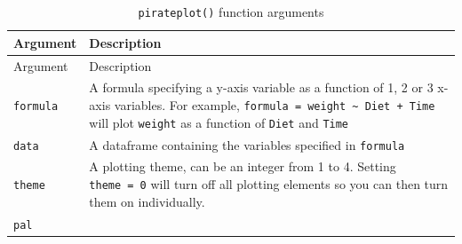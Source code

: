 \documentclass[]{book}
\theoremstyle{definition}
\theoremstyle{definition}
\theoremstyle{remark}
\begin{document}
\begin{longtable}[]{@{}ll@{}}
\caption{\label{tab:pirateplot} \texttt{pirateplot()} function
arguments}\tabularnewline
\toprule
\begin{minipage}[b]{0.18\columnwidth}\raggedright\strut
Argument\strut
\end{minipage} & \begin{minipage}[b]{0.67\columnwidth}\raggedright\strut
Description\strut
\end{minipage}\tabularnewline
\midrule
\endfirsthead
\toprule
\begin{minipage}[b]{0.18\columnwidth}\raggedright\strut
Argument\strut
\end{minipage} & \begin{minipage}[b]{0.67\columnwidth}\raggedright\strut
Description\strut
\end{minipage}\tabularnewline
\midrule
\endhead
\begin{minipage}[t]{0.18\columnwidth}\raggedright\strut
\texttt{formula}\strut
\end{minipage} & \begin{minipage}[t]{0.67\columnwidth}\raggedright\strut
A formula specifying a y-axis variable as a function of 1, 2 or 3 x-axis
variables. For example,
\texttt{formula\ =\ weight\ \textasciitilde{}\ Diet\ +\ Time} will plot
\texttt{weight} as a function of \texttt{Diet} and \texttt{Time}\strut
\end{minipage}\tabularnewline
\begin{minipage}[t]{0.18\columnwidth}\raggedright\strut
\texttt{data}\strut
\end{minipage} & \begin{minipage}[t]{0.67\columnwidth}\raggedright\strut
A dataframe containing the variables specified in \texttt{formula}\strut
\end{minipage}\tabularnewline
\begin{minipage}[t]{0.18\columnwidth}\raggedright\strut
\texttt{theme}\strut
\end{minipage} & \begin{minipage}[t]{0.67\columnwidth}\raggedright\strut
A plotting theme, can be an integer from 1 to 4. Setting
\texttt{theme\ =\ 0} will turn off all plotting elements so you can then
turn them on individually.\strut
\end{minipage}\tabularnewline
\begin{minipage}[t]{0.18\columnwidth}\raggedright\strut
\texttt{pal}\strut
\end{minipage} & \begin{minipage}[t]{0.67\columnwidth}\raggedright\strut

\end{minipage}
\end{longtable}
\end{document}
